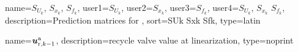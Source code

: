 
{
  name={\ensuremath{S_{U_k}}, \ensuremath{S_{x_k}}, \ensuremath{S_{f_k}}},
  user1={\ensuremath{S_{U_k}}},
  user2={\ensuremath{S_{x_k}}},
  user3={\ensuremath{S_{f_k}}},
  user4={\ensuremath{S_{U_k}}, \ensuremath{S_{x_k}}  \ensuremath{S_{f_k}}},
  description={Prediction matrices for },
  sort={SUk Sxk Sfk},
  type={latin}
}



{
  name={\ensuremath{\vc{u}_{\text{r},k-1}^\text{a}}},
  description={recycle valve value at linearization},
  type={noprint}
}
